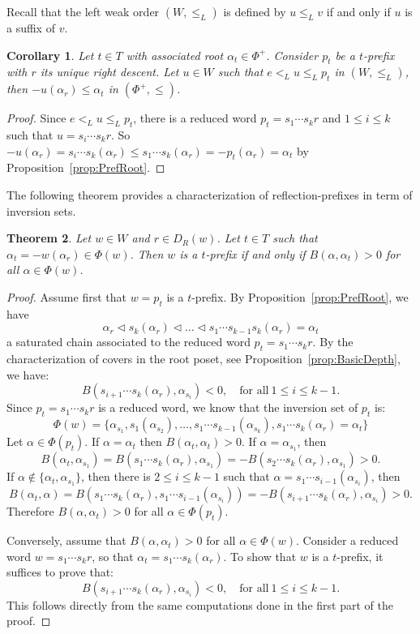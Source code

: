 \documentclass{amsart}
\newtheorem{Theorem}{Theorem}[section]
\newtheorem{Corollary}[Theorem]{Corollary}
\theoremstyle{definition}
\begin{document}
 Recall that the left weak order $(W,\leq_L)$ is defined by $u\leq_L v$ if and only if $u$ is a suffix of $v$. 

\begin{Corollary}\label{cor:Pref2} Let $t\in T$ with associated root $\alpha_t\in \Phi^+$. Consider $p_t$ be a $t$-prefix with $r$ its unique right descent. Let $u\in W$ such that  $e<_Lu\leq_L p_t$ in $(W,\leq_L)$, then $-u(\alpha_r)\leq \alpha_t$ in  $(\Phi^+,\leq)$.
\end{Corollary}
\begin{proof}  Since $e<_L u\leq_L p_t$, there is a reduced word $p_t=s_1\cdots  s_k r$ and $1\leq i\leq k$ such that $u=s_i\cdots s_k r$. So $-u(\alpha_r)=s_i\cdots s_k(\alpha_r)\leq s_1\cdots s_k(\alpha_r)=-p_t(\alpha_r)=\alpha_t$ by Proposition~\ref{prop:PrefRoot}.
\end{proof}


The following theorem provides a characterization of reflection-prefixes in term of inversion sets.


\begin{Theorem}\label{thm:Pref1}  Let $w\in W$ and $r\in D_R(w)$. Let $t\in T$ such that $\alpha_t=-w(\alpha_r)\in \Phi(w)$. Then $w$ is a $t$-prefix if and only if $B(\alpha,\alpha_t)>0$ for all $\alpha\in \Phi(w)$. 
\end{Theorem}
%
\begin{proof}  Assume first that $w=p_t$ is a $t$-prefix. By Proposition~\ref{prop:PrefRoot}, we have
$$
\alpha_{r}\lhd s_k(\alpha_{r})\lhd\dots\lhd s_1\cdots s_{k-1} s_k(\alpha_r)=\alpha_t
$$ 
 a saturated chain associated to the reduced word $p_t=s_1 \cdots s_kr$.  By the characterization of covers in the root poset, see Proposition~\ref{prop:BasicDepth}, we have: 
$$
 B(s_{i+1}\cdots s_k(\alpha_{r}),\alpha_{s_{i}})<0,\quad \textrm{for all} \ 1\leq i\leq k-1.
$$
Since $p_t=s_1\cdots s_kr$ is a reduced word, we know that the inversion set of $p_t$ is:
$$
\Phi(w)=\{\alpha_{s_1},s_1(\alpha_{s_2}),\dots,s_1\cdots s_{k-1}(\alpha_{s_k}),s_1\cdots s_k(\alpha_r)=\alpha_t\}
$$
Let $\alpha\in \Phi(p_t)$. If $\alpha=\alpha_t$ then $B(\alpha_t,\alpha_t)>0$. If $\alpha=\alpha_{s_1}$, then
$$
B(\alpha_t,\alpha_{s_1})=B(s_1\cdots s_k(\alpha_{r}),\alpha_{s_{1}})= -B(s_2\cdots s_k(\alpha_{r}),\alpha_{s_{1}})>0.
$$
If $\alpha\notin\{ \alpha_t,\alpha_{s_1}\}$, then there is $2\leq i\leq k-1$ such that $\alpha=s_1\cdots s_{i-1}(\alpha_{s_{i}})$, then 
$$
 B(\alpha_t,\alpha)=B(s_1\cdots s_k(\alpha_{r}),s_1\cdots s_{i-1}(\alpha_{s_{i}}))=- B(s_{i+1}\cdots s_k(\alpha_r),\alpha_{s_{i}})>0.
$$
Therefore   $B(\alpha,\alpha_t)>0$ for all $\alpha\in \Phi(p_t)$.

\smallskip

Conversely, assume that $B(\alpha,\alpha_t)>0$ for all $\alpha\in \Phi(w)$. Consider a reduced word $w=s_1\cdots s_k r$, so that $\alpha_t=s_1\cdots s_k(\alpha_r)$. To show that $w$ is a $t$-prefix, it suffices to prove that:
$$
 B(s_{i+1}\cdots s_k(\alpha_{r}),\alpha_{s_{i}})<0,\quad \textrm{for all} \ 1\leq i\leq k-1.
$$
This follows directly from the same computations done in the first part of the proof. 
\end{proof}
\end{document}
